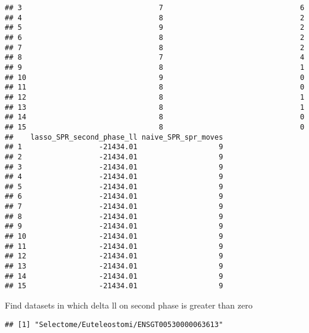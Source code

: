 \documentclass[
]{article}
\newenvironment{Shaded}{\begin{snugshade}}{\end{snugshade}}
\newcommand{\DecValTok}[1]{\textcolor[rgb]{0.00,0.00,0.81}{#1}}
\newcommand{\KeywordTok}[1]{\textcolor[rgb]{0.13,0.29,0.53}{\textbf{#1}}}
\newcommand{\NormalTok}[1]{#1}
\newcommand{\OperatorTok}[1]{\textcolor[rgb]{0.81,0.36,0.00}{\textbf{#1}}}
\newcommand{\StringTok}[1]{\textcolor[rgb]{0.31,0.60,0.02}{#1}}
\begin{document}
\begin{verbatim}
## 3                                7                                6
## 4                                8                                2
## 5                                9                                2
## 6                                8                                2
## 7                                8                                2
## 8                                7                                4
## 9                                8                                1
## 10                               9                                0
## 11                               8                                0
## 12                               8                                1
## 13                               8                                1
## 14                               8                                0
## 15                               8                                0
##    lasso_SPR_second_phase_ll naive_SPR_spr_moves
## 1                  -21434.01                   9
## 2                  -21434.01                   9
## 3                  -21434.01                   9
## 4                  -21434.01                   9
## 5                  -21434.01                   9
## 6                  -21434.01                   9
## 7                  -21434.01                   9
## 8                  -21434.01                   9
## 9                  -21434.01                   9
## 10                 -21434.01                   9
## 11                 -21434.01                   9
## 12                 -21434.01                   9
## 13                 -21434.01                   9
## 14                 -21434.01                   9
## 15                 -21434.01                   9
\end{verbatim}

Find datasets in which delta ll on second phase is greater than zero

\begin{Shaded}
\end{Shaded}

\begin{verbatim}
## [1] "Selectome/Euteleostomi/ENSGT00530000063613"
\end{verbatim}
\end{document}

